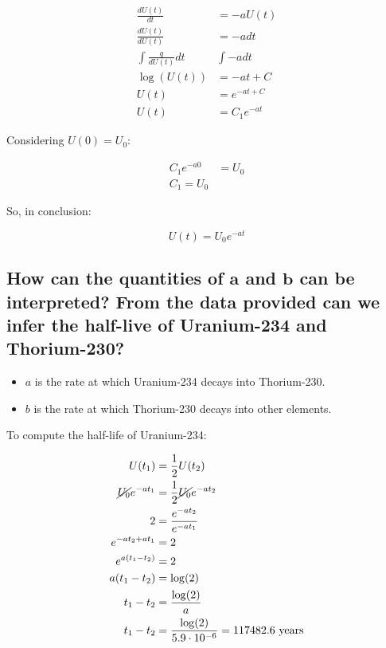   \begin{align*}
    \frac{dU(t)}{dt} &= -aU(t) \\
    \frac{dU(t)}{dU(t)} &= -adt \\
    \int \frac{q}{dU(t)}dt & \int -adt \\
    \log(U(t)) &= -at + C \\
    U(t) &= e^{-at + C}\\
    U(t) &= C_1e^{-at}
  \end{align*}

  Considering $U(0) = U_0$:

  \begin{align*}
    C_1e^{-a0} &= U_0\\
    C_1 = U_0
  \end{align*}

  So, in conclusion:

  $$U(t) = U_0e^{-at}$$

  \subsection{How can the quantities of $\mathbf{a}$ and $\mathbf{b}$ can be interpreted? From the data provided can we infer the half-live of Uranium-234 and Thorium-230?}

  \begin{multicols}{2}
    \begin{itemize}
      \item $a$ is the rate at which Uranium-234 decays into Thorium-230.
      \item $b$ is the rate at which Thorium-230 decays into other elements.
    \end{itemize}
  \end{multicols}

  To compute the half-life of Uranium-234:

  \begin{align*}
    U(t_1) &= \frac{1}{2}U(t_2)\\
    \cancel{U_0}e^{-at_1} &= \frac{1}{2}\cancel{U_0}e^{-at_2}\\
    2 &= \frac{e^{-a t_2}}{e^{-a t_1}}\\
    e^{-a t_2 + at_1} &= 2\\
    e^{a(t_1 - t_2)} &= 2\\
    a(t_1 - t_2) &= \log(2)\\
    t_1 - t_2 &= \frac{\log(2)}{a}\\
    t_1 - t_2 &= \frac{\log(2)}{5.9 \cdot 10^{-6}} = 117482.6\text{ years}\\
  \end{align*}



